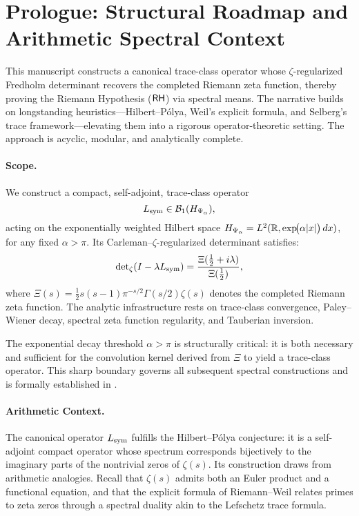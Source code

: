 \section*{Prologue: Structural Roadmap and Arithmetic Spectral Context}
\label{sec:prologue}

\medskip

\noindent
This manuscript constructs a canonical trace-class operator whose \(\zeta\)-regularized Fredholm determinant recovers the completed Riemann zeta function, thereby proving the Riemann Hypothesis (\(\mathsf{RH}\)) via spectral means. The narrative builds on longstanding heuristics—Hilbert--Pólya, Weil's explicit formula, and Selberg's trace framework—elevating them into a rigorous operator-theoretic setting. The approach is acyclic, modular, and analytically complete.

\paragraph*{Scope.}
We construct a compact, self-adjoint, trace-class operator
\[
L_{\mathrm{sym}} \in \mathcal{B}_1(H_{\Psi_\alpha}),
\]
acting on the exponentially weighted Hilbert space \( H_{\Psi_\alpha} = L^2(\mathbb{R}, \exp\!\bigl(\alpha |x|\bigr)\,dx) \), for any fixed \( \alpha > \pi \). Its Carleman--\(\zeta\)-regularized determinant satisfies:
\[
\det\nolimits_{\zeta}(I - \lambda L_{\mathrm{sym}}) = \frac{\Xi(\tfrac{1}{2} + i\lambda)}{\Xi(\tfrac{1}{2})},
\]
where \( \Xi(s) = \tfrac{1}{2}s(s-1)\pi^{-s/2} \Gamma(s/2) \zeta(s) \) denotes the completed Riemann zeta function. The analytic infrastructure rests on trace-class convergence, Paley--Wiener decay, spectral zeta function regularity, and Tauberian inversion.

The exponential decay threshold \( \alpha > \pi \) is structurally critical: it is both necessary and sufficient for the convolution kernel derived from \( \Xi \) to yield a trace-class operator. This sharp boundary governs all subsequent spectral constructions and is formally established in .

\paragraph*{Arithmetic Context.}
The canonical operator \( L_{\mathrm{sym}} \) fulfills the Hilbert--Pólya conjecture: it is a self-adjoint compact operator whose spectrum corresponds bijectively to the imaginary parts of the nontrivial zeros of \( \zeta(s) \). Its construction draws from arithmetic analogies. Recall that \( \zeta(s) \) admits both an Euler product and a functional equation, and that the explicit formula of Riemann--Weil relates primes to zeta zeros through a spectral duality akin to the Lefschetz trace formula.

